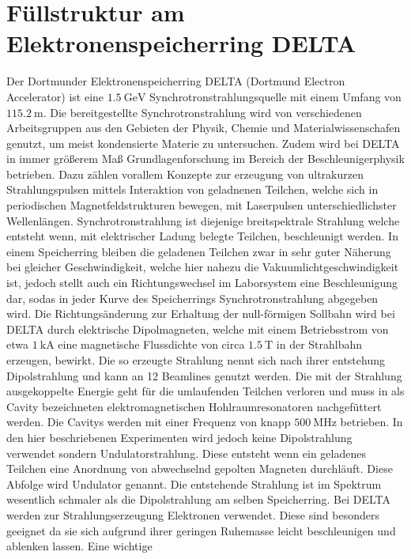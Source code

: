 \section{Füllstruktur am Elektronenspeicherring DELTA}
\label{sec:Einleitung}
Der Dortmunder Elektronenspeicherring DELTA (Dortmund Electron Accelerator) ist eine 
$\SI{1,5}{\giga\electronvolt}$ Synchrotronstrahlungsquelle mit einem Umfang von $\SI{115,2}{\meter}$.
Die bereitgestellte Synchrotronstrahlung wird von verschiedenen Arbeitsgruppen aus den Gebieten der 
Physik, Chemie und Materialwissenschafen genutzt, um meist kondensierte Materie zu untersuchen. Zudem 
wird bei DELTA in immer größerem Maß Grundlagenforschung im Bereich der Beschleunigerphysik betrieben.
Dazu zählen vorallem Konzepte zur erzeugung von ultrakurzen Strahlungspulsen mittels Interaktion von
geladnenen Teilchen, welche sich in periodischen Magnetfeldstrukturen bewegen, mit Laserpulsen 
unterschiedlichster Wellenlängen. Synchrotronstrahlung ist diejenige breitspektrale Strahlung welche 
entsteht wenn, mit elektrischer Ladung belegte Teilchen, beschleunigt werden. In einem Speicherring 
bleiben die geladenen Teilchen zwar in sehr guter Näherung bei gleicher Geschwindigkeit, welche hier 
nahezu die Vakuumlichtgeschwindigkeit ist, jedoch stellt auch ein Richtungswechsel im Laborsystem eine 
Beschleunigung dar, sodas in jeder Kurve des Speicherrings Synchrotronstrahlung abgegeben wird. Die 
Richtungsänderung zur Erhaltung der null-förmigen Sollbahn wird bei DELTA durch elektrische Dipolmagneten, 
welche mit einem Betriebsstrom von etwa $\SI{1}{\kilo\ampere}$ eine magnetische Flussdichte von circa 
$\SI{1,5}{\tesla}$ in der Strahlbahn erzeugen, bewirkt. Die so erzeugte Strahlung nennt sich nach ihrer 
entstehung Dipolstrahlung und kann an 12 Beamlines genutzt werden. Die mit der Strahlung 
ausgekoppelte Energie geht für die umlaufenden Teilchen verloren und muss in als Cavity bezeichneten 
elektromagnetischen Hohlraumresonatoren nachgefüttert werden. Die Cavitys werden mit einer Frequenz von 
knapp $\SI{500}{\mega\hertz}$ betrieben. In den hier beschriebenen Experimenten wird jedoch keine 
Dipolstrahlung verwendet sondern Undulatorstrahlung. Diese entsteht wenn ein geladenes Teilchen eine 
Anordnung von abwechselnd gepolten Magneten durchläuft. Diese Abfolge wird Undulator genannt. Die 
entstehende Strahlung ist im Spektrum wesentlich schmaler als die Dipolstrahlung am selben Speicherring.
Bei DELTA werden zur Strahlungserzeugung Elektronen verwendet. Diese sind besonders geeignet da sie sich
aufgrund ihrer geringen Ruhemasse leicht beschleunigen und ablenken lassen. Eine wichtige 
